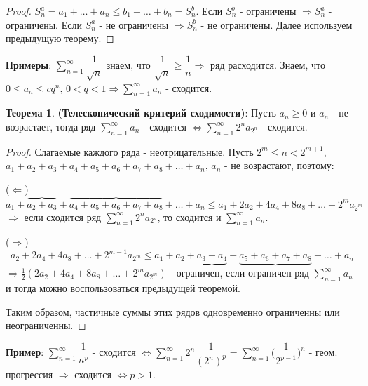 \documentclass[12pt]{article}
\theoremstyle{definition}
\newtheorem{theorem}{Теорема}
\begin{document}
\begin{proof}
	$S_n^a = a_1 + \dotsc + a_n \leq b_1 + \dotsc + b_n = S_n^b$. Если $S_n^b$ - ограничены $\Rightarrow S_n^a$ - ограничены. Если $S_n^a$ - не ограничены $\Rightarrow S_n^b$ - не ограничены. Далее используем предыдущую теорему.
\end{proof}

\textbf{Примеры}: $\displaystyle \sum\limits_{n=1}^{\infty} \dfrac{1}{\sqrt{n}}$ знаем, что $\dfrac{1}{\sqrt{n}} \geq \dfrac{1}{n} \Rightarrow$ ряд расходится. Знаем, что $0 \leq a_n \leq c q^n, \, 0 < q < 1 \Rightarrow \displaystyle \sum\limits_{n=1}^{\infty} a_n$ - сходится.

\begin{theorem} \textbf{(Телескопический критерий сходимости)}:
	Пусть $a_n \geq 0$ и $a_n$ - не возрастает, тогда ряд $\displaystyle \sum\limits_{n=1}^{\infty} a_n$ - сходится $\Leftrightarrow \displaystyle \sum\limits_{n=1}^{\infty}2^n a_{2^n}$ - сходится. 
\end{theorem}

\begin{proof}
Слагаемые каждого ряда - неотрицательные. Пусть $2^m \leq n < 2^{m+1}$, $a_1 + a_2 + a_3 + a_4 + a_5 + a_6 + a_7 + a_8 + \dotsc + a_n$, $a_n$ - не возрастают, поэтому:

($\Leftarrow$)
$$a_1 + \overbrace{a_2 + a_3} + \overbrace{a_4 + a_5 + a_6 + a_7 + a_8} + \dotsc + a_n \leq a_1 + 2a_2 + 4a_4 + 8a_8 + \dotsc + 2^ma_{2^m}$$ 
$\Rightarrow$ если сходится ряд $\displaystyle \sum\limits_{n=1}^{\infty}2^n a_{2^n}$, то сходится и $\displaystyle \sum\limits_{n=1}^{\infty} a_n$.

($\Rightarrow$)  $$ a_2 + 2 a_4 + 4a_8 + \dotsc + 2^{m-1}a_{2^m} \leq a_1 + a_2 + \underbrace{a_3 + a_4} + \underbrace{a_5 + a_6 + a_7 + a_8} + \dotsc + a_n$$ $\Rightarrow \frac{1}{2}(2a_2 + 4a_4 + 8a_8 + \dotsc + 2^{m}a_{2^m})$ - ограничен, если ограничен ряд $\displaystyle \sum\limits_{n=1}^{\infty} a_n$ и тогда можно воспользоваться предыдущей теоремой.

Таким образом, частичные суммы этих рядов одновременно ограниченны или неограниченны.
\end{proof}

\textbf{Пример}: $\displaystyle \sum\limits_{n=1}^{\infty}\dfrac{1}{n^p}$ - сходится $\Leftrightarrow \displaystyle \sum\limits_{n=1}^{\infty}2^n\dfrac{1}{(2^n)^p} = \displaystyle \sum\limits_{n=1}^{\infty}\bigg(\dfrac{1}{2^{p-1}}\bigg)^n$ - геом. прогрессия $\Rightarrow$ сходится $\Leftrightarrow p>1$.
\end{document}
